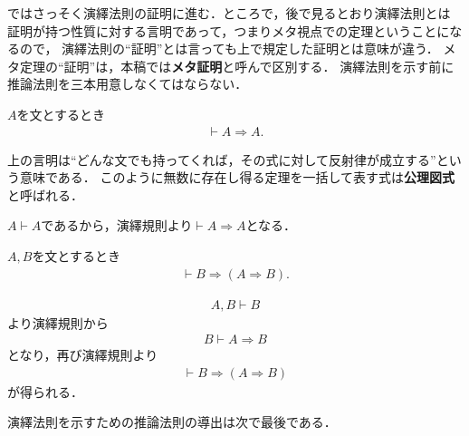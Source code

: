 	ではさっそく演繹法則の証明に進む．ところで，後で見るとおり演繹法則とは
	証明が持つ性質に対する言明であって，つまりメタ視点での定理ということになるので，
	演繹法則の``証明''とは言っても上で規定した証明とは意味が違う．
	メタ定理の``証明''は，本稿では{\bf メタ証明}と呼んで区別する．
	演繹法則を示す前に推論法則を三本用意しなくてはならない．
	
	\begin{screen}
		\begin{logicalthm}[含意の反射律]\label{logicalthm:reflective_law_of_implication}
			$A$を文とするとき
			\begin{align}
				\vdash A \Longrightarrow A.
			\end{align}
		\end{logicalthm}
	\end{screen}
	
	上の言明は``どんな文でも持ってくれば，その式に対して反射律が成立する''という意味である．
	このように無数に存在し得る定理を一括して表す式は{\bf 公理図式}と呼ばれる．
	
	\begin{prf}
		$A \vdash A$であるから，演繹規則より$\vdash A \Longrightarrow A$となる．
		\QED
	\end{prf}
	
	\begin{screen}
		\begin{logicalthm}[正しい式は仮定を選ばない]\label{logicalthm:rule_of_inference_2}
			$A,B$を文とするとき
			\begin{align}
				\vdash B \Longrightarrow (A \Longrightarrow B).
			\end{align}
		\end{logicalthm}
	\end{screen}
	
	\begin{prf}
		\begin{align}
			A,B \vdash B
		\end{align}
		より演繹規則から
		\begin{align}
			B \vdash A \Longrightarrow B
		\end{align}
		となり，再び演繹規則より
		\begin{align}
			\vdash B \Longrightarrow (A \Longrightarrow B)
		\end{align}
		が得られる．
		\QED
	\end{prf}
	
	演繹法則を示すための推論法則の導出は次で最後である．
	
